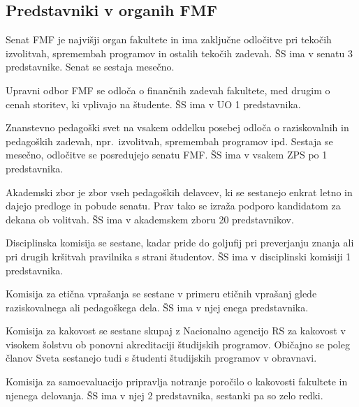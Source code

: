 \documentclass[a4paper,oneside,12pt]{article}
\theoremstyle{definition}
\newenvironment{description*}{\vspace{-6pt}\begin{description}\setlength{\itemsep}{0pt}\setlength{\parskip}{2pt}}{\end{description}\vspace{-1\parskip}}
\begin{document}
\subsection*{Predstavniki v organih FMF}
\begin{description*}
  \item[Senat FMF] je najvišji organ fakultete in ima zaključne odločitve pri tekočih izvolitvah,
    spremembah programov in ostalih tekočih zadevah. ŠS ima v senatu 3 predstavnike. Senat se
    sestaja mesečno.
  \item[Upravni odbor FMF] se odloča o finančnih zadevah fakultete, med drugim o cenah storitev, ki
    vplivajo na študente. ŠS ima v UO 1 predstavnika.
  \item[Znanstevno pedagoški svet] na vsakem oddelku posebej odloča o raziskovalnih in pedagoških
    zadevah, npr.~izvolitvah, spremembah programov ipd. Sestaja se mesečno, odločitve se posredujejo
    senatu FMF.  ŠS ima v vsakem ZPS po 1 predstavnika.
  \item[Akademski zbor] je zbor vseh pedagoških delavcev, ki se sestanejo enkrat letno in dajejo
    predloge in pobude senatu. Prav tako se izraža podporo kandidatom za dekana ob volitvah. ŠS ima
    v akademskem zboru 20 predstavnikov.
  \item[Disciplinska komisija] se sestane, kadar pride do goljufij pri preverjanju znanja ali pri
    drugih kršitvah pravilnika s strani študentov. ŠS ima v disciplinski komisiji 1 predstavnika.
  \item[Komisija za etična vprašanja] se sestane v primeru etičnih vprašanj glede raziskovalnega ali
    pedagoškega dela. ŠS ima v njej enega predstavnika.
  \item[Komisija za kakovost] se sestane skupaj z Nacionalno agencijo RS za kakovost v visokem
    šolstvu ob ponovni akreditaciji študijskih programov. Običajno se poleg članov Sveta sestanejo
    tudi s študenti študijskih programov v obravnavi.
  \item[Komisija za samoevaluacijo] pripravlja notranje poročilo o kakovosti fakultete in njenega
    delovanja. ŠS ima v njej 2 predstavnika, sestanki pa so zelo redki.
\end{description*}
\end{document}

